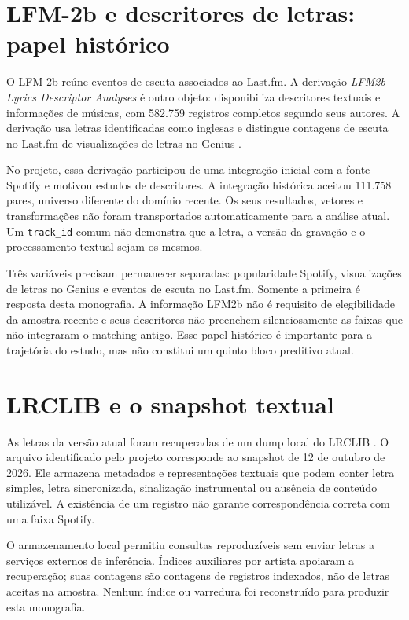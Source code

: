 \section{LFM-2b e descritores de letras: papel histórico}
O LFM-2b reúne eventos de escuta associados ao Last.fm. A derivação \emph{LFM2b Lyrics Descriptor Analyses} é outro objeto: disponibiliza descritores textuais e informações de músicas, com 582.759 registros completos segundo seus autores. A derivação usa letras identificadas como inglesas e distingue contagens de escuta no Last.fm de visualizações de letras no Genius \citep{parada2024data}.

No projeto, essa derivação participou de uma integração inicial com a fonte Spotify e motivou estudos de descritores. A integração histórica aceitou 111.758 pares, universo diferente do domínio recente. Os seus resultados, vetores e transformações não foram transportados automaticamente para a análise atual. Um \texttt{track\_id} comum não demonstra que a letra, a versão da gravação e o processamento textual sejam os mesmos.

Três variáveis precisam permanecer separadas: popularidade Spotify, visualizações de letras no Genius e eventos de escuta no Last.fm. Somente a primeira é resposta desta monografia. A informação LFM2b não é requisito de elegibilidade da amostra recente e seus descritores não preenchem silenciosamente as faixas que não integraram o matching antigo. Esse papel histórico é importante para a trajetória do estudo, mas não constitui um quinto bloco preditivo atual.

\section{LRCLIB e o snapshot textual}
As letras da versão atual foram recuperadas de um dump local do LRCLIB \citep{lrclib}. O arquivo identificado pelo projeto corresponde ao snapshot de 12 de outubro de 2026. Ele armazena metadados e representações textuais que podem conter letra simples, letra sincronizada, sinalização instrumental ou ausência de conteúdo utilizável. A existência de um registro não garante correspondência correta com uma faixa Spotify.

O armazenamento local permitiu consultas reproduzíveis sem enviar letras a serviços externos de inferência. Índices auxiliares por artista apoiaram a recuperação; suas contagens são contagens de registros indexados, não de letras aceitas na amostra. Nenhum índice ou varredura foi reconstruído para produzir esta monografia.

